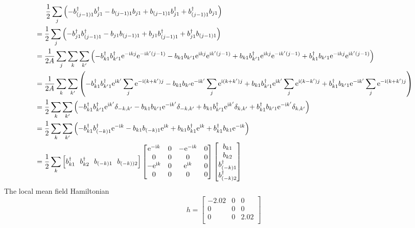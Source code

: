 \documentclass[letter]{article}
\newcommand{\e}{\mathrm{e}}
\newcommand{\ii}{\mathrm{i}}
\begin{document}
$$\begin{aligned}
    & \indent  \frac{1}{2}\sum_{j}\left(-b_{(j-1)1}^{\dagger}b_{j1}^{\dagger}-b_{(j-1)1}b_{j1}+b_{(j-1)1}b_{j1}^{\dagger}+b_{(j-1)1}^{\dagger}b_{j1}\right)\\
    &= \frac{1}{2}\sum_{j}\left(-b_{j1}^{\dagger}b_{(j-1)1}^{\dagger}-b_{j1}b_{(j-1)1}+b_{j1}b_{(j-1)1}^{\dagger}+b_{j1}^{\dagger}b_{(j-1)1}\right)\\
    &=\frac{1}{2A}\sum_{j}\sum_{k}\sum_{k'}\left(-b_{k1}^{\dagger}b_{k'1}^{\dagger}\e^{-\ii kj}\e^{-\ii k'(j-1)}-b_{k1}b_{k'1}\e^{\ii kj}\e^{\ii k'(j-1)}+b_{k1}b_{k'1}^{\dagger}\e^{\ii kj}\e^{-\ii k'(j-1)}+b_{k1}^{\dagger}b_{k'1}\e^{-\ii kj}\e^{\ii k'(j-1)}\right)\\
    &=\frac{1}{2A}\sum_{k}\sum_{k'}\left(-b_{k1}^{\dagger}b_{k'1}^{\dagger}\e^{\ii k'}\sum_j \e^{-\ii (k+k')j}-b_{k1}b_{k'}\e^{-\ii k'}\sum_j \e^{\ii (k+k')j}+b_{k1}b_{k'1}^{\dagger}\e^{\ii k'}\sum_j \e^{\ii (k-k')j}+b_{k1}^{\dagger}b_{k'1}\e^{-\ii k'}\sum_j \e^{-\ii (k+k')j}\right)\\
    &=\frac{1}{2}\sum_k\sum_{k'}\left(-b_{k1}^{\dagger}b_{k'1}^{\dagger}\e^{\ii k'}\delta_{-k,k'}-b_{k1}b_{k'1}\e^{-\ii k'}\delta_{-k,k'}+b_{k1}b_{k'1}^{\dagger}\e^{\ii k'}\delta_{k,k'}+b_{k1}^{\dagger}b_{k'1}\e^{-\ii k'}\delta_{k,k'}\right)\\
    &=\frac{1}{2}\sum_k\sum_{k'}\left(-b_{k1}^{\dagger}b_{(-k)1}^{\dagger}\e^{-\ii k}-b_{k1}b_{(-k)1}\e^{\ii k}+b_{k1}b_{k1}^{\dagger}\e^{\ii k}+b_{k1}^{\dagger}b_{k1}\e^{-\ii k}\right)\\
    &=\frac{1}{2}\sum_k \left[
      b_{k1}^{\dagger} \ \ 
      b_{k2}^{\dagger}\  \ 
      b_{(-k)1}\ \ 
      b_{(-k))2}\right]
     \begin{bmatrix}
          \e^{-\ii k} & 0 & -\e^{-\ii k} & 0 \\
         0 &  0 & 0 &0 \\
         -\e^{\ii k} &  0 & \e^{\ii k} &0\\
          0 & 0 & 0& 0
          \end{bmatrix}\begin{bmatrix}
              b_{k1}  \\
              b_{k2}  \\
              b_{(-k)1}^{\dagger}\\
              b_{(-k)2}^{\dagger}
              \end{bmatrix}
  \end{aligned}
  $$
The local mean field Hamiltonian $$
h=\begin{bmatrix}
    -2.02 & 0 & 0 \\
   0 &  0 & 0  \\
  0 &  0 & 2.02 \\
    \end{bmatrix}
$$
\end{document}
